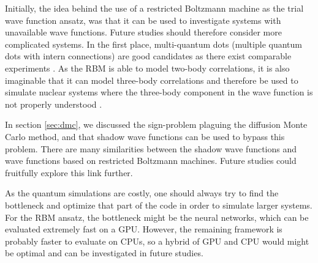 Initially, the idea behind the use of a restricted Boltzmann machine as the trial wave function ansatz, was that it can be used to investigate systems with unavailable wave functions. Future studies should therefore consider more complicated systems. In the first place, multi-quantum dots (multiple quantum dots with intern connections) are good candidates as there exist comparable experiments \supercite{marzin_photoluminescence_1994,brunner_sharp-line_1994}. As the RBM is able to model two-body correlations, it is also imaginable that it can model three-body correlations and therefore be used to simulate nuclear systems where the three-body component in the wave function is not properly understood \supercite{sauer_three-nucleon_2014}.

In section \ref{sec:dmc}, we discussed the sign-problem plaguing the diffusion Monte Carlo method, and that shadow wave functions can be used to bypass this problem. There are many similarities between the shadow wave functions and wave functions based on restricted Boltzmann machines. Future studies could fruitfully explore this link further.

As the quantum simulations are costly, one should always try to find the bottleneck and optimize that part of the code in order to simulate larger systems. For the RBM ansatz, the bottleneck might be the neural networks, which can be evaluated extremely fast on a GPU. However, the remaining framework is probably faster to evaluate on CPUs, so a hybrid of GPU and CPU would might be optimal and can be investigated in future studies.
